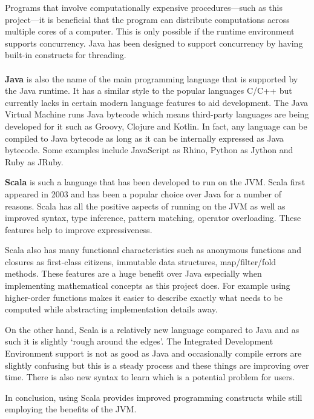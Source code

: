     Programs that involve computationally expensive procedures---such as this project---it is beneficial that the program can distribute computations across multiple cores of a computer. This is only possible if the runtime environment supports concurrency. Java has been designed to support concurrency by having built-in constructs for threading. 

    \paragraph{}

    \textbf{Java} is also the name of the main programming language that is supported by the Java runtime. It has a similar style to the popular languages C/C++ but currently lacks in certain modern language features to aid development. The Java Virtual Machine runs Java bytecode which means third-party languages are being developed for it such as Groovy, Clojure and Kotlin. In fact, any language can be compiled to Java bytecode as long as it can be internally expressed as Java bytecode. Some examples include JavaScript as Rhino, Python as Jython and Ruby as JRuby.

    \textbf{Scala} is such a language that has been developed to run on the JVM. Scala first appeared in 2003 and has been a popular choice over Java for a number of reasons.
    Scala has all the positive aspects of running on the JVM as well as improved syntax, type inference, pattern matching, operator overloading. These features help to improve expressiveness.

    Scala also has many functional characteristics such as anonymous functions and closures as first-class citizens, immutable data structures, map/filter/fold methods. These features are a huge benefit over Java especially when implementing mathematical concepts as this project does. For example using higher-order functions makes it easier to describe exactly what needs to be computed while abstracting implementation details away.

    On the other hand, Scala is a relatively new language compared to Java and as such it is slightly `rough around the edges'. The Integrated Development Environment support is not as good as Java and occasionally compile errors are slightly confusing but this is a steady process and these things are improving over time. There is also new syntax to learn which is a potential problem for users.

    In conclusion, using Scala provides improved programming constructs while still employing the benefits of the JVM.

